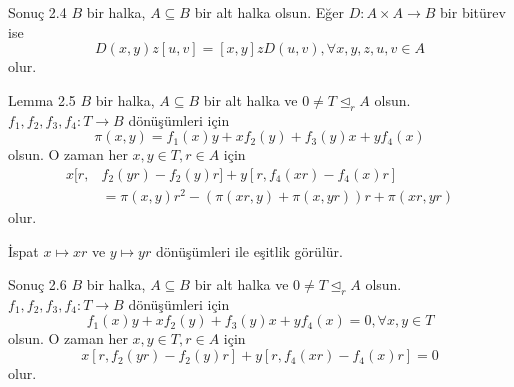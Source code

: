 \documentclass{beamer}
\begin{document}
\begin{frame}

\begin{block}{Sonuç 2.4}
$B$ bir halka, $A \subseteq B$ bir alt halka olsun. Eğer $D \colon A \times A \to B$ bir bitürev ise
\begin{equation*}
    D(x,y)z[u,v] = [x,y]zD(u,v), \forall x,y,z,u,v \in A
\end{equation*}
olur.
\end{block}
    
\end{frame}

\begin{frame}

\begin{block}{Lemma 2.5}
$B$ bir halka, $A \subseteq B$ bir alt halka ve $0 \neq T \trianglelefteq_r A$ olsun. $f_1, f_2, f_3, f_4 \colon T \to B$ dönüşümleri için
\begin{equation*}
    \pi(x,y) = f_1(x)y + xf_2(y) + f_3(y)x + yf_4(x)
\end{equation*}
olsun. O zaman her $x,y \in T, r \in A$ için
\begin{align*}
    x[r,&f_2(yr) - f_2(y)r]+y[r,f_4(xr) - f_4(x)r]\\&= \pi(x,y)r^2 - (\pi(xr,y) + \pi(x,yr))r + \pi(xr,yr)
\end{align*}
olur.
\end{block}

\begin{block}{İspat}
$x \mapsto xr$ ve $y \mapsto yr$ dönüşümleri ile eşitlik görülür.
\end{block}
    
\end{frame}

\begin{frame}

\begin{block}{Sonuç 2.6}
$B$ bir halka, $A \subseteq B$ bir alt halka ve $0 \neq T \trianglelefteq_r A$ olsun. $f_1, f_2, f_3, f_4 \colon T \to B$ dönüşümleri için
\begin{equation*}
    f_1(x)y + xf_2(y) + f_3(y)x + yf_4(x) = 0, \forall x, y \in T
\end{equation*}
olsun. O zaman her $x,y \in T, r \in A$ için
\begin{equation*}
    x[r,f_2(yr) - f_2(y)r]+y[r,f_4(xr) - f_4(x)r] = 0
\end{equation*}
olur.
\end{block}
    
\end{frame}
\end{document}
